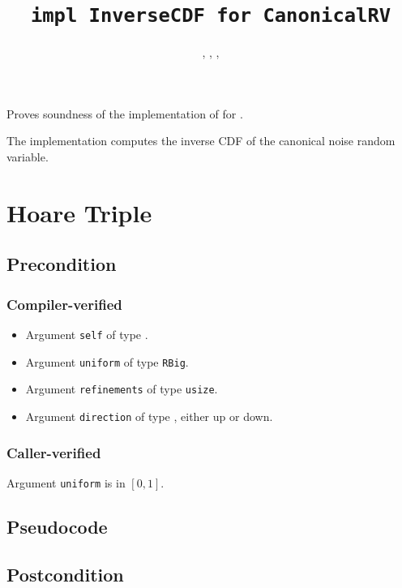 \documentclass{article}
\title{\texttt{impl InverseCDF for CanonicalRV}}
\author{\AishwaryaRamasethuAuthor, \YuJuKuAuthor, \JordanAwanAuthor, \MichaelShoemateAuthor}
\begin{document}
\maketitle
\contrib

Proves soundness of the implementation of 
for .

The implementation computes the inverse CDF of the canonical noise random variable.

\section{Hoare Triple}

\subsection*{Precondition}
\subsubsection*{Compiler-verified}
\begin{itemize}
    \item Argument \texttt{self} of type .
    \item Argument \texttt{uniform} of type \texttt{RBig}.
    \item Argument \texttt{refinements} of type \texttt{usize}.
    \item Argument \texttt{direction} of type , either up or down.
\end{itemize}

\subsubsection*{Caller-verified}
Argument \texttt{uniform} is in $[0, 1]$.

\subsection*{Pseudocode}



\subsection*{Postcondition}
\end{document}
